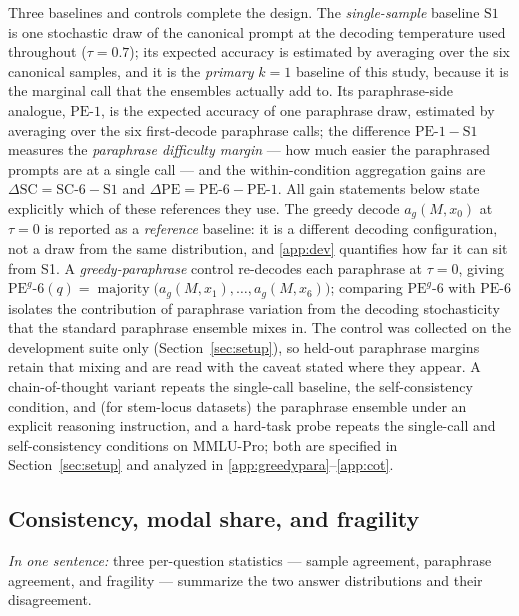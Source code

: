Three baselines and controls complete the design. The \emph{single-sample} baseline $\mathrm{S1}$ is one stochastic draw of the canonical prompt at the decoding temperature used throughout ($\tau = 0.7$); its expected accuracy is estimated by averaging over the six canonical samples, and it is the \emph{primary} $k{=}1$ baseline of this study, because it is the marginal call that the ensembles actually add to. Its paraphrase-side analogue, $\mathrm{PE}\text{-}1$, is the expected accuracy of one paraphrase draw, estimated by averaging over the six first-decode paraphrase calls; the difference $\mathrm{PE}\text{-}1 - \mathrm{S1}$ measures the \emph{paraphrase difficulty margin} --- how much easier the paraphrased prompts are at a single call --- and the within-condition aggregation gains are $\Delta\mathrm{SC} = \mathrm{SC}\text{-}6 - \mathrm{S1}$ and $\Delta\mathrm{PE} = \mathrm{PE}\text{-}6 - \mathrm{PE}\text{-}1$. All gain statements below state explicitly which of these references they use. The greedy decode $a_g(M, x_0)$ at $\tau = 0$ is reported as a \emph{reference} baseline: it is a different decoding configuration, not a draw from the same distribution, and \ref{app:dev} quantifies how far it can sit from S1. A \emph{greedy-paraphrase} control re-decodes each paraphrase at $\tau = 0$, giving $\mathrm{PE}^{g}\text{-}6(q) = \operatorname{majority}\bigl( a_g(M, x_1), \dots, a_g(M, x_6) \bigr)$; comparing $\mathrm{PE}^{g}\text{-}6$ with $\mathrm{PE}\text{-}6$ isolates the contribution of paraphrase variation from the decoding stochasticity that the standard paraphrase ensemble mixes in. The control was collected on the development suite only (Section~\ref{sec:setup}), so held-out paraphrase margins retain that mixing and are read with the caveat stated where they appear. A chain-of-thought variant repeats the single-call baseline, the self-consistency condition, and (for stem-locus datasets) the paraphrase ensemble under an explicit reasoning instruction, and a hard-task probe repeats the single-call and self-consistency conditions on MMLU-Pro; both are specified in Section~\ref{sec:setup} and analyzed in \ref{app:greedypara}--\ref{app:cot}.

\subsection{Consistency, modal share, and fragility}

\emph{In one sentence:} three per-question statistics --- sample agreement, paraphrase agreement, and fragility --- summarize the two answer distributions and their disagreement.

